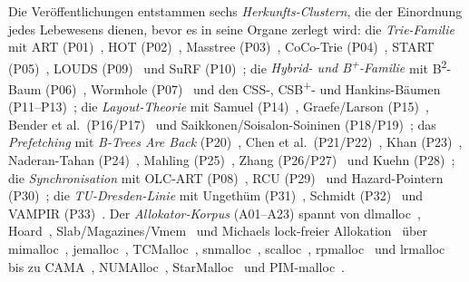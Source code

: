 \begin{nurkurz}
Die Veröffentlichungen entstammen sechs \emph{Herkunfts-Clustern}, die der Einordnung jedes Lebewesens dienen,
bevor es in seine Organe zerlegt wird: die \emph{Trie-Familie} mit ART (P01)~\cite{leis2013art}, HOT
(P02)~\cite{binna2018hot}, Masstree (P03)~\cite{mao2012masstree}, CoCo-Trie (P04)~\cite{boffa2024coco}, START
(P05)~\cite{fent2020start}, LOUDS (P09)~\cite{jacobson1989louds} und SuRF (P10)~\cite{zhang2018surf}; die
\emph{Hybrid- und B\textsuperscript{+}-Familie} mit B\textsuperscript{2}-Baum (P06)~\cite{schmeisser2022b2tree},
Wormhole (P07)~\cite{wu2019wormhole} und den CSS-, CSB\textsuperscript{+}- und Hankins-Bäumen
(P11--P13)~\cite{rao1999css,rao2000csb,hankins2003nodesize}; die \emph{Layout-Theorie} mit Samuel
(P14)~\cite{samuel2005procaware}, Graefe/Larson (P15)~\cite{graefe2001btree}, Bender et
al.\ (P16/P17)~\cite{bender2000cobtree,bender2005coboblivious,bender2002treelayout,bender2002scanning,bender2002orderlist}
und Saikkonen/Soisalon-Soininen
(P18/P19)~\cite{saikkonen2008multilevel,saikkonen2016layout}; das \emph{Prefetching} mit \emph{B-Trees Are Back}
(P20)~\cite{mueller2025btreesback}, Chen et al.\ (P21/P22)~\cite{chen2001prefetch,chen2002fractal}, Khan
(P23)~\cite{khan2010adaptive}, Naderan-Tahan (P24)~\cite{naderan2016adaptivefilter}, Mahling
(P25)~\cite{mahling2025hotpath}, Zhang (P26/P27)~\cite{zhang2024pathprefix,zhang2025hierarchical} und Kuehn
(P28)~\cite{kuehn2023bplustree}; die \emph{Synchronisation} mit OLC-ART (P08)~\cite{leis2016olc}, RCU
(P29)~\cite{mckenney2001rcu} und Hazard-Pointern (P30)~\cite{michael2004hazard}; die \emph{TU-Dresden-Linie}
mit Ungethüm (P31)~\cite{ungethuem2017survey}, Schmidt (P32)~\cite{schmidt2025hbm} und VAMPIR
(P33)~\cite{berthold2023vampir}. Der \emph{Allokator-Korpus} (A01--A23) spannt von
dlmalloc~\cite{lea1996dlmalloc}, Hoard~\cite{berger2000hoard}, Slab/Magazines/Vmem~\cite{bonwick1994slab,bonwick2001vmem}
und Michaels lock-freier Allokation~\cite{michael2004lockfree} über mimalloc~\cite{leijen2019mimalloc},
jemalloc~\cite{evans2006jemalloc}, TCMalloc~\cite{ghemawat2005tcmalloc}, snmalloc~\cite{lietar2019snmalloc},
scalloc~\cite{aigner2015scalloc}, rpmalloc~\cite{jansson2017rpmalloc} und lrmalloc~\cite{leite2018lrmalloc} bis
zu CAMA~\cite{herter2011cama}, NUMAlloc~\cite{yang2023numalloc}, StarMalloc~\cite{reitz2024starmalloc} und
PIM-malloc~\cite{pimmalloc2026}.
\end{nurkurz}

